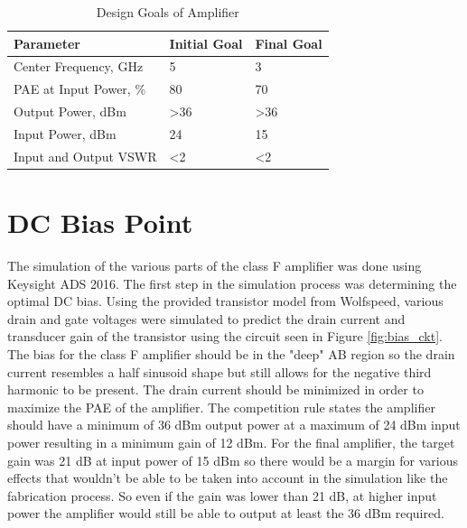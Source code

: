 
\begin{table}
    \centering
    \caption{Design Goals of Amplifier}
    \label{table:design_goal}
    \begin{tabular}{|l|l|l|}
      \hline
      {Parameter}                      & {Initial Goal}     & {Final Goal} \\ \hline
      {Center Frequency, GHz}          & 5                  & 3 \\ \hline
      {PAE at Input Power, \%}         & 80                 & 70 \\ \hline
      {Output Power, dBm}              & {\textgreater 36}  & {\textgreater 36} \\ \hline
      {Input Power, dBm}               & 24                 & 15 \\ \hline
      {Input and Output VSWR}          & {\textless 2}      & {\textless 2} \\ \hline
    \end{tabular}
\end{table}

\section{DC Bias Point}
The simulation of the various parts of the class F amplifier was done using Keysight ADS 2016. The first step in the simulation process was determining the optimal DC bias. Using the provided transistor model from Wolfspeed, various drain and gate voltages were simulated to predict the drain current and transducer gain of the transistor using the circuit seen in Figure \ref{fig:bias_ckt}. The bias for the class F amplifier should be in the "deep" AB region so the drain current resembles a half sinusoid shape but still allows for the negative third harmonic to be present. The drain current should be minimized in order to maximize the PAE of the amplifier. The competition rule states the amplifier should have a minimum of 36 dBm output power at a maximum of 24 dBm input power resulting in a minimum gain of 12 dBm. For the final amplifier, the target gain was 21 dB at input power of 15 dBm so there would be a margin for various effects that wouldn't be able to be taken into account in the simulation like the fabrication process. So even if the gain was lower than 21 dB, at higher input power the amplifier would still be able to output at least the 36 dBm required.

